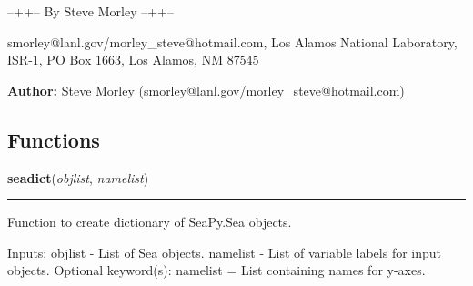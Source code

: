 --++-- By Steve Morley --++--

smorley@lanl.gov/morley\_steve@hotmail.com, Los Alamos National Laboratory,
ISR-1, PO Box 1663, Los Alamos, NM 87545

\textbf{Author:} Steve Morley (smorley@lanl.gov/morley\_steve@hotmail.com)





  \subsection{Functions}

    \label{spacepy:seapy:seadict}

    \vspace{0.5ex}

\hspace{.8\funcindent}\begin{boxedminipage}{\funcwidth}

    \raggedright \textbf{seadict}(\textit{objlist}, \textit{namelist})

    \vspace{-1.5ex}

    \rule{\textwidth}{0.5\fboxrule}
\setlength{\parskip}{2ex}
    Function to create dictionary of SeaPy.Sea objects.

    Inputs: objlist - List of Sea objects. namelist - List of variable 
    labels for input objects. Optional keyword(s): namelist = List 
    containing names for y-axes.

\setlength{\parskip}{1ex}
    \end{boxedminipage}

    \label{spacepy:seapy:multisea}

    \vspace{0.5ex}

